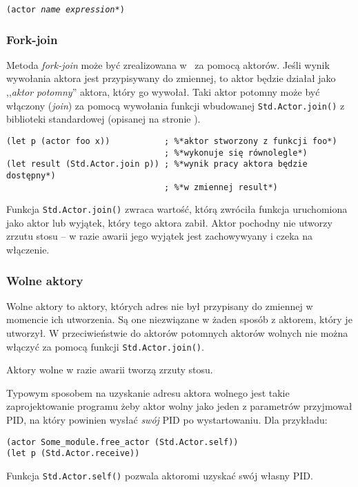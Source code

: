 \texttt{(actor \emph{name} \emph{expression}*)}

\subsubsection{Fork-join}

Metoda \emph{fork-join} może być zrealizowana w \ViuAct\ za pomocą aktorów. Jeśli wynik wywołania aktora jest
przypisywany do zmiennej, to aktor będzie działał jako ,,\emph{aktor potomny}'' aktora, który go wywołał. Taki
aktor potomny może być włączony (\emph{join}) za pomocą wywołania funkcji wbudowanej \texttt{Std.Actor.join()}
z biblioteki standardowej (opisanej na stronie \pageref{Std_Actor_join}).

\begin{lstlisting}
(let p (actor foo x))           ; %*aktor stworzony z funkcji foo*)
                                ; %*wykonuje się równolegle*)
(let result (Std.Actor.join p)) ; %*wynik pracy aktora będzie dostępny*)
                                ; %*w zmiennej result*)
\end{lstlisting}

Funkcja \texttt{Std.Actor.join()} zwraca wartość, którą zwróciła funkcja uruchomiona jako aktor lub wyjątek,
który tego aktora zabił. Aktor pochodny nie utworzy zrzutu stosu -- w razie awarii jego wyjątek jest
zachowywyany i czeka na włączenie.

\subsubsection{Wolne aktory}

Wolne aktory to aktory, których adres nie był przypisany do zmiennej w momencie ich utworzenia. Są one
niezwiązane w żaden sposób z aktorem, który je utworzył. W przeciwieństwie do aktorów potomnych aktorów
wolnych nie można włączyć za pomocą funkcji \texttt{Std.Actor.join()}.

Aktory wolne w razie awarii tworzą zrzuty stosu.

Typowym sposobem na uzyskanie adresu aktora wolnego jest takie zaprojektowanie programu żeby aktor wolny jako
jeden z parametrów przyjmował PID, na który powinien wysłać \emph{swój} PID po wystartowaniu. Dla przykładu:

\begin{lstlisting}
(actor Some_module.free_actor (Std.Actor.self))
(let p (Std.Actor.receive))
\end{lstlisting}

Funkcja \texttt{Std.Actor.self()} pozwala aktoromi uzyskać swój własny PID.

